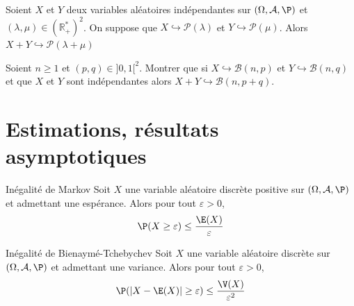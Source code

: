 \documentclass[french,11pt,twoside]{VcCours}
\begin{document}
\begin{Corollaire}{} Soient $X$ et $Y$ deux variables aléatoires indépendantes sur $(\Omega, \mathcal{A}, \P)$ et $(\lambda, \mu) \in (\mathbb{R}_+^{*})^2$. On suppose que $X \hookrightarrow \mathcal{P}(\lambda)$ et $Y \hookrightarrow \mathcal{P}(\mu)$. Alors $X+Y \hookrightarrow \mathcal{P}(\lambda+\mu)$
\end{Corollaire}

\begin{Demonstration}{}

\vspace{5cm}
\end{Demonstration}

\begin{ApplicationDirecte}{} Soient $n \geq 1$ et $(p,q) \in ]0,1[^2$. Montrer que si $X \hookrightarrow \mathcal{B}(n,p)$ et $Y \hookrightarrow \mathcal{B}(n,q)$ et que $X$ et $Y$ sont indépendantes alors $X+Y \hookrightarrow \mathcal{B}(n,p+q)$.
\end{ApplicationDirecte}

\section{Estimations, résultats asymptotiques}

\begin{Theoreme}{Inégalité de Markov}
Soit $X$ une variable aléatoire discrète positive sur $(\Omega, \mathcal{A}, \P)$ et admettant une espérance. Alors pour tout $\varepsilon>0$,
$$ \P(X \geq \varepsilon) \leq \dfrac{\E(X)}{\varepsilon}$$
\end{Theoreme}

\begin{Demonstration}{}

\vspace{5cm}
\end{Demonstration}

\begin{Theoreme}{Inégalité de Bienaymé-Tchebychev}
Soit $X$ une variable aléatoire discrète sur $(\Omega, \mathcal{A}, \P)$ et admettant une variance. Alors pour tout $\varepsilon>0$,
$$ \P( \vert X- \E(X) \vert \geq \varepsilon) \leq \dfrac{\V(X)}{\varepsilon^2}$$
\end{Theoreme}

\begin{Demonstration}{}
\vspace{5cm}
\end{Demonstration}
\end{document}
